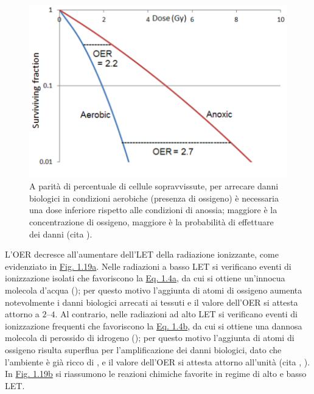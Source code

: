 \documentclass[12pt,a4paper,twoside]{report}
\begin{document}
	\begin{figure}[H]
		\centering
		\includegraphics[width=0.9\linewidth]{images/oer_survival.png}
		\caption{A parità di percentuale di cellule sopravvissute, per arrecare danni biologici in condizioni aerobiche (presenza di ossigeno) è necessaria una dose inferiore rispetto alle condizioni di anossia; maggiore è la concentrazione di ossigeno, maggiore è la probabilità di effettuare dei danni (cita
			).}
		\label{fig:oer_survival}
	\end{figure}
	
	L'OER decresce all'aumentare dell'LET della radiazione ionizzante, come evidenziato in \hyperref[fig:let_oer]{Fig. 1.19a}. Nelle radiazioni a basso LET si verificano eventi di ionizzazione isolati che favoriscono la \hyperref[eq:prodotto1]{Eq. 1.4a}, da cui si ottiene un'innocua molecola d'acqua (); per questo motivo l'aggiunta di atomi di ossigeno aumenta notevolmente i danni biologici arrecati ai tessuti e il valore dell'OER si attesta attorno a $2$--$4$. Al contrario, nelle radiazioni ad alto LET si verificano eventi di ionizzazione frequenti che favoriscono la \hyperref[eq:prodotto2]{Eq. 1.4b}, da cui si ottiene una dannosa molecola di perossido di idrogeno (); per questo motivo l'aggiunta di atomi di ossigeno risulta superflua per l'amplificazione dei danni biologici, dato che l'ambiente è già ricco di , e il valore dell'OER si attesta attorno all'unità (cita
	,
	). In \hyperref[fig:reaction_let]{Fig. 1.19b} si riassumono le reazioni chimiche favorite in regime di alto e basso LET.
	
\end{document}
